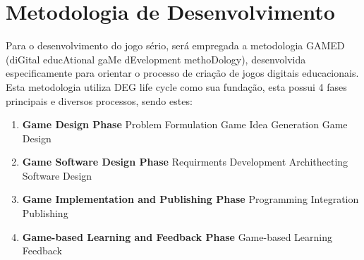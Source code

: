 \section{Metodologia de Desenvolvimento}

Para o desenvolvimento do jogo sério, será empregada a metodologia GAMED (diGital educAtional gaMe dEvelopment methoDology), desenvolvida especificamente para orientar o processo de criação de jogos digitais educacionais. Esta metodologia utiliza DEG life cycle como sua fundação, esta possui 4 fases principais e diversos processos, sendo estes:

\begin{enumerate}
  \item \textbf{Game Design Phase}
    \subitem Problem Formulation
    \subitem Game Idea Generation
    \subitem Game Design
  \item \textbf{Game Software Design Phase}
    \subitem Requirments Development
    \subitem Archithecting
    \subitem Software Design
  \item \textbf{Game Implementation and Publishing Phase}
    \subitem Programming
    \subitem Integration
    \subitem Publishing
  \item \textbf{Game-based Learning and Feedback Phase}
    \subitem Game-based Learning
    \subitem Feedback
\end{enumerate}
